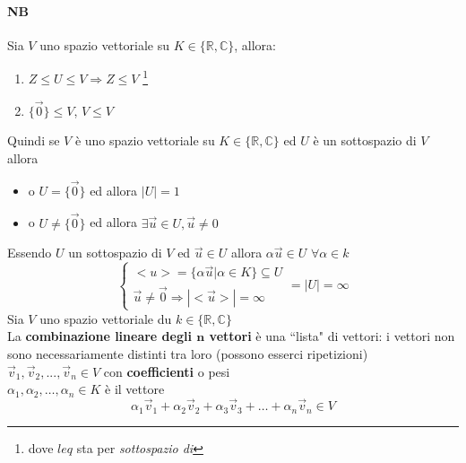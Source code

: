 \paragraph{NB} Sia $V$ uno spazio vettoriale su 
$K\in\{\mathbb{R}, \mathbb{C}\}$, 
allora: 
\begin{enumerate}
    \item $Z\leq U\leq V \Longrightarrow Z\leq V$ \footnote{
            dove $leq$ sta per \textit{sottospazio di }
        }
    \item $\{\vec{0}\}\leq V$, $V\leq V$
\end{enumerate}
Quindi se $V$ è uno spazio vettoriale su $K\in\{\mathbb{R},\mathbb{C}\} $ 
ed $U$ è un sottospazio di $V$ allora 
\begin{itemize}
    \item o $U=\{\vec{0}\}$ ed allora $|U|=1$
    \item o $U\neq\{\vec{0}\}$ ed allora $\exists\vec{u}\in U,\vec{u}\neq 0$
\end{itemize}
Essendo $U$ un sottospazio di $V$ ed $\vec{u}\in U$ allora $\alpha\vec{u}\in U$ 
$\forall\alpha\in k$\\

\[
    \begin{cases}
        <u>=\{\alpha\vec{u}| \alpha\in K\}\subseteq U\\
        \vec{u}\neq \vec{0}\Longrightarrow |<\vec{u}>|=\infty
    \end{cases}
    =|U|=\infty
\]
Sia $V$ uno spazio vettoriale du $k\in\{\mathbb{R}, \mathbb{C}\}$ \\
La \textbf{combinazione lineare degli $\pmb{n}$ vettori}
{\color{red} è una ``lista" di vettori: i vettori non sono necessariamente
distinti tra loro (possono esserci ripetizioni)}\\
$\vec{v}_1, \vec{v}_2, ..., \vec{v}_n \in V$ con \textbf{coefficienti} o pesi\\
$\alpha_1, \alpha_2, \dots, \alpha_n\in K$ è il vettore \[
    \alpha_1\vec{v}_1+\alpha_2\vec{v}_2+\alpha_3\vec{v}_3+\dots+\alpha_n\vec{v}_n\in V
\]
